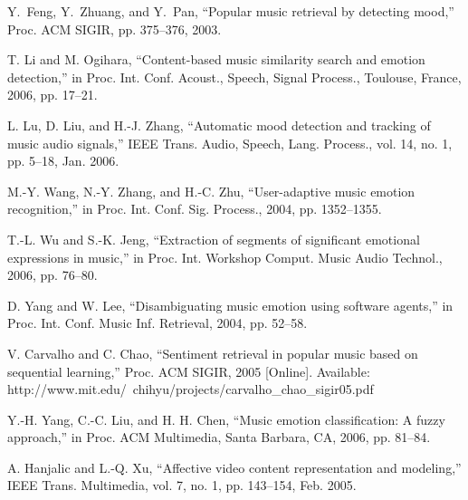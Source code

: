 \documentclass[journal, twoside]{IEEEtran}
\begin{document}
%
%
%
\begin{thebibliography}{1}

Y.~Feng, Y.~Zhuang, and Y.~Pan, “Popular music retrieval by detecting
mood,” Proc. ACM SIGIR, pp. 375–376, 2003.

T. Li and M. Ogihara, “Content-based music similarity search and emotion detection,” in Proc. Int. Conf. Acoust., Speech, Signal Process.,
Toulouse, France, 2006, pp. 17–21.

L. Lu, D. Liu, and H.-J. Zhang, “Automatic mood detection and
tracking of music audio signals,” IEEE Trans. Audio, Speech, Lang.
Process., vol. 14, no. 1, pp. 5–18, Jan. 2006.

 M.-Y. Wang, N.-Y. Zhang, and H.-C. Zhu, “User-adaptive music
emotion recognition,” in Proc. Int. Conf. Sig. Process., 2004, pp.
1352–1355.

T.-L. Wu and S.-K. Jeng, “Extraction of segments of significant emotional expressions in music,” in Proc. Int. Workshop Comput. Music
Audio Technol., 2006, pp. 76–80.


D. Yang and W. Lee, “Disambiguating music emotion using software
agents,” in Proc. Int. Conf. Music Inf. Retrieval, 2004, pp. 52–58.


V. Carvalho and C. Chao, “Sentiment retrieval in popular music based
on sequential learning,” Proc. ACM SIGIR, 2005 [Online]. Available:
http://www.mit.edu/~chihyu/projects/carvalho\_chao\_sigir05.pdf



Y.-H. Yang, C.-C. Liu, and H. H. Chen, “Music emotion classification: A fuzzy approach,” in Proc. ACM Multimedia, Santa Barbara, CA,
2006, pp. 81–84.



A. Hanjalic and L.-Q. Xu, “Affective video content representation and
modeling,” IEEE Trans. Multimedia, vol. 7, no. 1, pp. 143–154, Feb.
2005.



\end{thebibliography}
\end{document}
